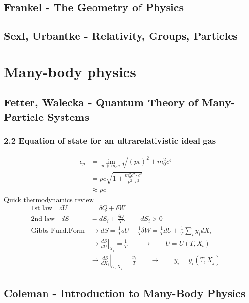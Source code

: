 \documentclass[10pt,a4paper]{book}
\theoremstyle{definition}
\begin{document}
\section{{\sc Frankel} - The Geometry of Physics}

\section{{\sc Sexl, Urbantke} - Relativity, Groups, Particles}

\chapter{Many-body physics}

\section{{\sc Fetter, Walecka} - Quantum Theory of Many-Particle Systems}
\subsection{2.2 Equation of state for an ultrarelativistic ideal gas}
\begin{align}
\epsilon_p
&=\lim_{p\gg m_0c}\sqrt{(pc)^2+m_0^2c^4}\\
&=pc\sqrt{1+\frac{m_0^2c^2\cdot c^2}{p^2\cdot c^2}}\\
&\approx pc
\end{align}
Quick thermodynamics review
\begin{align}
\text{1st law}\quad dU&=\delta Q+\delta W\\
\text{2nd law}\quad dS&=dS_i+\frac{\delta Q}{T}, \qquad dS_i>0\\
\text{Gibbs Fund.Form}&\rightarrow dS=\frac{1}{T}dU-\frac{1}{T}\delta W=\frac{1}{T}dU+\frac{1}{T}\sum_i y_idX_i\\
&\rightarrow \left.\frac{dS}{dU}\right|_{X_i}=\frac{1}{T}\qquad\rightarrow\qquad U=U(T,X_i)\\
&\rightarrow \left.\frac{dS}{dX_i}\right|_{U,X_j}=\frac{y_i}{T}\qquad\rightarrow\qquad y_i=y_i(T,X_j)
\end{align}

\section{{\sc Coleman} - Introduction to Many-Body Physics}
\end{document}
